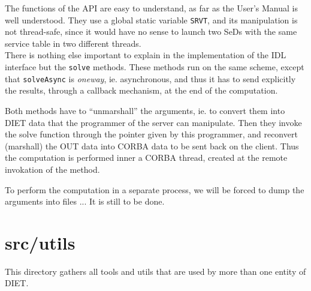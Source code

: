 The functions of the API are easy to understand, as far as the User's Manual is
well understood. They use a global static variable \texttt{SRVT}, and its
manipulation is not thread-safe, since it would have no sense to launch two SeDs
with the same service table in two different threads.
\\

There is nothing else important to explain in the implementation of the IDL
interface but the \texttt{solve} methods. These methods run on the same
scheme, except that \texttt{solveAsync} is \textit{oneway}, ie. asynchronous,
and thus it has to send explicitly the results, through a callback mechanism, at
the end of the computation.


Both methods have to ``unmarshall'' the arguments, ie. to convert them into DIET
data that the programmer of the server can manipulate. Then they invoke the
solve function through the pointer given by this programmer, and reconvert
(marshall) the OUT data into CORBA data to be sent back on the client. Thus the
computation is performed inner a CORBA thread, created at the remote invokation
of the method.

To perform the computation in a separate process, we will be forced to dump the
arguments into files ... It is still to be done.


\section{\textsf{src/utils}}
\label{s:utils}

This directory gathers all tools and utils that are used by more than one entity
of DIET.

